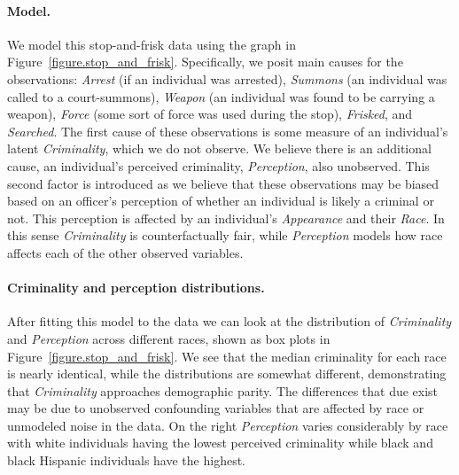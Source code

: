 \paragraph{Model.}
We model this stop-and-frisk data using the graph in Figure~\ref{figure.stop_and_frisk}. Specifically, we posit main causes for the observations: \emph{Arrest} (if an individual was arrested), \emph{Summons} (an individual was called to a court-summons), \emph{Weapon} (an individual was found to be carrying a weapon), \emph{Force} (some sort of force was used during the stop), \emph{Frisked}, and \emph{Searched}. The first cause of these observations is some measure of an individual's latent \emph{Criminality}, which we do not observe. We believe there is an additional cause, an individual's perceived criminality, \emph{Perception}, also unobserved. This second factor is introduced as we believe that these observations may be biased based on an officer's perception of whether an individual is likely a criminal or not. This perception is affected by an individual's \emph{Appearance} and their \emph{Race}. In this sense \emph{Criminality} is counterfactually fair, while \emph{Perception} models how race affects each of the other observed variables.

\paragraph{Criminality and perception distributions.}
After fitting this model to the data we can look at the distribution of \emph{Criminality} and \emph{Perception} across different races, shown as box plots in Figure~\ref{figure.stop_and_frisk}. We see that the median criminality for each race is nearly identical, while the distributions are somewhat different, demonstrating that \emph{Criminality} approaches demographic parity. The differences that due exist may be due to unobserved confounding variables that are affected by race or unmodeled noise in the data. On the right \emph{Perception} varies considerably by race with white individuals having the lowest perceived criminality while black and black Hispanic individuals have the highest.


